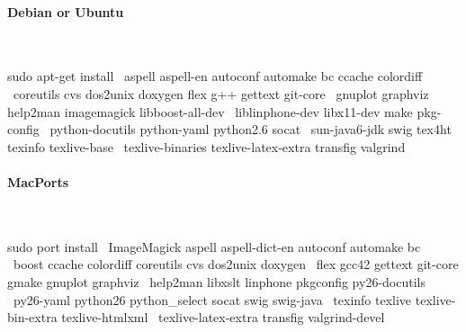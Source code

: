 \paragraph{Debian or Ubuntu}~\\
\begin{shell}
sudo apt-get install  \
   aspell aspell-en autoconf automake bc ccache colordiff  \
   coreutils cvs dos2unix doxygen flex g++ gettext git-core  \
   gnuplot graphviz help2man imagemagick libboost-all-dev  \
   liblinphone-dev libx11-dev make pkg-config  \
   python-docutils python-yaml python2.6 socat  \
   sun-java6-jdk swig tex4ht texinfo texlive-base  \
   texlive-binaries texlive-latex-extra transfig valgrind

\end{shell}

\paragraph{MacPorts}~\\
\begin{shell}
sudo port install  \
   ImageMagick aspell aspell-dict-en autoconf automake bc  \
   boost ccache colordiff coreutils cvs dos2unix doxygen  \
   flex gcc42 gettext git-core gmake gnuplot graphviz  \
   help2man libxslt linphone pkgconfig py26-docutils  \
   py26-yaml python26 python_select socat swig swig-java  \
   texinfo texlive texlive-bin-extra texlive-htmlxml  \
   texlive-latex-extra transfig valgrind-devel

\end{shell}
